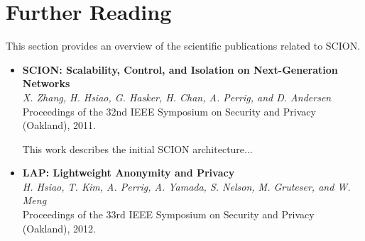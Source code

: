 \section{Further Reading}

This section provides an overview of the scientific publications related to SCION.

\begin{itemize}

\item \textbf{SCION: Scalability, Control, and Isolation on Next-Generation Networks}~\cite{ZHHCPA2011}\\
\textit{X. Zhang, H. Hsiao, G. Hasker, H. Chan, A. Perrig, and D. Andersen} \\
{\footnotesize Proceedings of the 32nd IEEE Symposium on Security and Privacy (Oakland), 2011.}

This work describes the initial SCION architecture...


\item \textbf{LAP: Lightweight Anonymity and Privacy}~\cite{HKPYNGM2012}\\
\textit{H. Hsiao, T. Kim, A. Perrig, A. Yamada, S. Nelson, M. Gruteser, and W. Meng} \\
{\footnotesize Proceedings of the 33rd IEEE Symposium on Security and Privacy (Oakland), 2012.}



\end{itemize}


